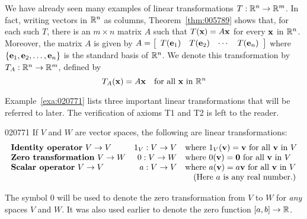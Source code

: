 We have already seen many examples of linear transformations $T : \mathbb{R}^n \to \mathbb{R}^m$. In fact, writing vectors in $\mathbb{R}^n$ as columns, Theorem~\ref{thm:005789} shows that, for each such $T$, there is an $m \times n$ matrix $A$ such that $T(\textbf{x}) = A\textbf{x}$ for every $\textbf{x}$ in $\mathbb{R}^n$. Moreover, the matrix $A$ is given by $A = \left[ \begin{array}{cccc}
T(\textbf{e}_{1}) & T(\textbf{e}_{2}) & \cdots & T(\textbf{e}_{n})
\end{array} \right]$ where $\{\textbf{e}_{1}, \textbf{e}_{2}, \dots, \textbf{e}_{n}\}$ is the standard basis of $\mathbb{R}^n$. We denote this transformation by $T_{A} : \mathbb{R}^n \to \mathbb{R}^m$, defined by
\begin{equation*}
T_A(\textbf{x}) = A\textbf{x} \quad \mbox{for all } \textbf{x} \mbox{ in } \mathbb{R}^n
\end{equation*}

Example~\ref{exa:020771} lists three important linear transformations that will be referred to later. The verification of axioms T1 and T2 is left to the reader.


\begin{example}{}{020771}
If $V$ and $W$ are vector spaces, the following are linear transformations:
\begin{equation*}
\begin{array}{lrl}
\mbox{\textbf{Identity operator}\index{identity operator}\index{linear transformations!identity operator} } V \to V & 1_V : V \to V & \mbox{where } 1_V(\vect{v}) = \vect{v} \mbox{ for all } \vect{v} \mbox{ in } V \\
\mbox{\textbf{Zero transformation}\index{zero transformation}\index{linear transformations!zero transformation} } V \to W & 0 : V \to W & \mbox{where } 0(\vect{v}) = \vect{0} \mbox{ for all } \vect{v} \mbox{ in } V \\
\mbox{\textbf{Scalar operator}\index{scalar operator}\index{linear transformations!scalar operator} } V \to V & a : V \to V & \mbox{where } a(\vect{v}) = a\vect{v} \mbox{ for all } \vect{v} \mbox{ in } V \\
& & \quad \mbox{(Here } a \mbox{ is any real number.)}
\end{array}
\end{equation*}
\end{example}

The symbol $0$ will be used to denote the zero transformation from $V$ to $W$ for \textit{any} spaces $V$ and $W$. It was also used earlier to denote the zero function $\left[a, b\right] \to \mathbb{R}$.


